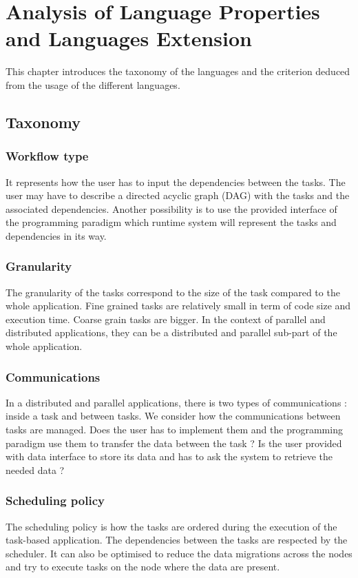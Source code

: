 \chapter{Analysis of Language Properties and Languages Extension}
\label{chap:taxonomy}

This chapter introduces the taxonomy of the languages and the criterion deduced from the usage of the different languages.

\section{Taxonomy}

\subsection{Workflow type}
It represents how the user has to input the dependencies between the tasks.
The user may have to describe a directed acyclic graph (DAG) with the tasks and the associated dependencies.
Another possibility is to use the provided interface of the programming paradigm which runtime system will represent the tasks and dependencies in its way.

\subsection{Granularity}
The granularity of the tasks correspond to the size of the task compared to the whole application.
Fine grained tasks are relatively small in term of code size and execution time.
Coarse grain tasks are bigger.
In the context of parallel and distributed applications, they can be a distributed and parallel sub-part of the whole application.

\subsection{Communications}
In a distributed and parallel applications, there is two types of communications : inside a task and between tasks.
We consider how the communications between tasks are managed.
Does the user has to implement them and the programming paradigm use them to transfer the data between the task ?
Is the user provided with data interface to store its data and has to ask the system to retrieve the needed data ?

\subsection{Scheduling policy}
The scheduling policy is how the tasks are ordered during the execution of the task-based application.
The dependencies between the tasks are respected by the scheduler.
It can also be optimised to reduce the data migrations across the nodes and try to execute tasks on the node where the data are present.

